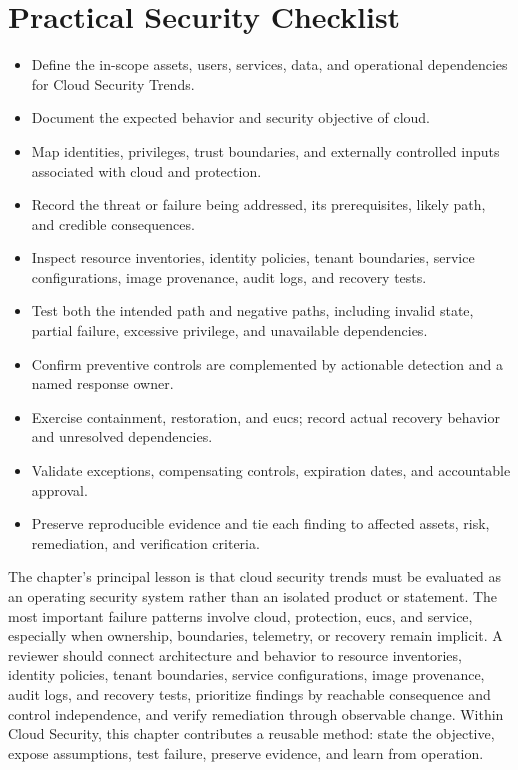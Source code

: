 \documentclass[11pt]{article}
\begin{document}
\section*{Practical Security Checklist}
\begin{itemize}[label=$\square$]
\item Define the in-scope assets, users, services, data, and operational dependencies for Cloud Security Trends.
\item Document the expected behavior and security objective of cloud.
\item Map identities, privileges, trust boundaries, and externally controlled inputs associated with cloud and protection.
\item Record the threat or failure being addressed, its prerequisites, likely path, and credible consequences.
\item Inspect resource inventories, identity policies, tenant boundaries, service configurations, image provenance, audit logs, and recovery tests.
\item Test both the intended path and negative paths, including invalid state, partial failure, excessive privilege, and unavailable dependencies.
\item Confirm preventive controls are complemented by actionable detection and a named response owner.
\item Exercise containment, restoration, and eucs; record actual recovery behavior and unresolved dependencies.
\item Validate exceptions, compensating controls, expiration dates, and accountable approval.
\item Preserve reproducible evidence and tie each finding to affected assets, risk, remediation, and verification criteria.
\end{itemize}
\begin{synthesisbox}
The chapter's principal lesson is that cloud security trends must be evaluated as an operating security system rather than an isolated product or statement. The most important failure patterns involve cloud, protection, eucs, and service, especially when ownership, boundaries, telemetry, or recovery remain implicit. A reviewer should connect architecture and behavior to resource inventories, identity policies, tenant boundaries, service configurations, image provenance, audit logs, and recovery tests, prioritize findings by reachable consequence and control independence, and verify remediation through observable change. Within Cloud Security, this chapter contributes a reusable method: state the objective, expose assumptions, test failure, preserve evidence, and learn from operation.
\end{synthesisbox}
\end{document}
